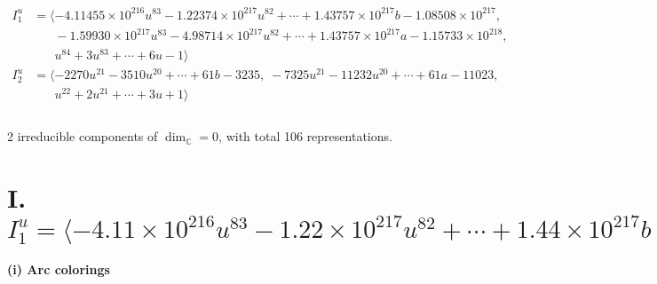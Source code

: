 \documentclass[1p]{elsarticle_modified}
\theoremstyle{definition}
\begin{document}
\begin{align*}
I^u_{1}&=\langle 
-4.11455\times10^{216} u^{83}-1.22374\times10^{217} u^{82}+\cdots+1.43757\times10^{217} b-1.08508\times10^{217},\\
\phantom{I^u_{1}}&\phantom{= \langle  }-1.59930\times10^{217} u^{83}-4.98714\times10^{217} u^{82}+\cdots+1.43757\times10^{217} a-1.15733\times10^{218},\\
\phantom{I^u_{1}}&\phantom{= \langle  }u^{84}+3 u^{83}+\cdots+6 u-1\rangle \\
I^u_{2}&=\langle 
-2270 u^{21}-3510 u^{20}+\cdots+61 b-3235,\;-7325 u^{21}-11232 u^{20}+\cdots+61 a-11023,\\
\phantom{I^u_{2}}&\phantom{= \langle  }u^{22}+2 u^{21}+\cdots+3 u+1\rangle \\
\\
\end{align*}
\raggedright * 2 irreducible components of $\dim_{\mathbb{C}}=0$, with total 106 representations.\\
\newpage
\renewcommand{\arraystretch}{1}
\centering \section*{I. $I^u_{1}= \langle -4.11\times10^{216} u^{83}-1.22\times10^{217} u^{82}+\cdots+1.44\times10^{217} b-1.09\times10^{217},\;-1.60\times10^{217} u^{83}-4.99\times10^{217} u^{82}+\cdots+1.44\times10^{217} a-1.16\times10^{218},\;u^{84}+3 u^{83}+\cdots+6 u-1 \rangle$}
\flushleft \textbf{(i) Arc colorings}\\
\end{document}
